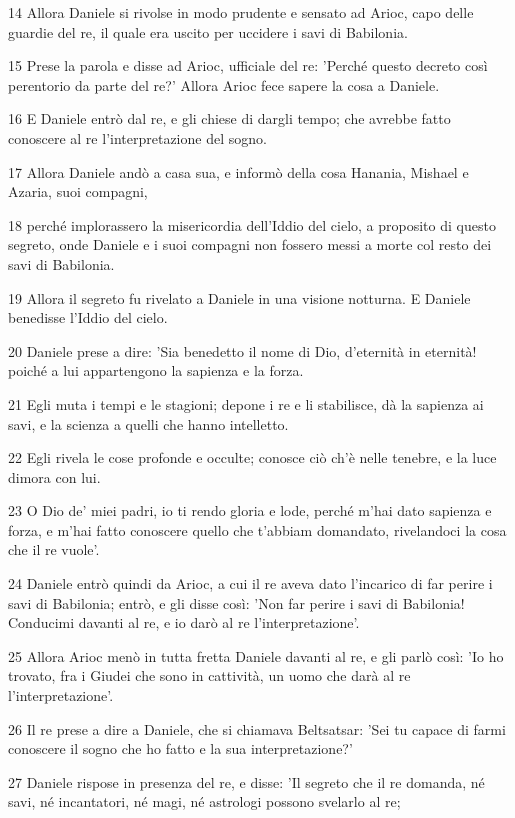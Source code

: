 \par 14 Allora Daniele si rivolse in modo prudente e sensato ad Arioc, capo delle guardie del re, il quale era uscito per uccidere i savi di Babilonia.
\par 15 Prese la parola e disse ad Arioc, ufficiale del re: 'Perché questo decreto così perentorio da parte del re?' Allora Arioc fece sapere la cosa a Daniele.
\par 16 E Daniele entrò dal re, e gli chiese di dargli tempo; che avrebbe fatto conoscere al re l'interpretazione del sogno.
\par 17 Allora Daniele andò a casa sua, e informò della cosa Hanania, Mishael e Azaria, suoi compagni,
\par 18 perché implorassero la misericordia dell'Iddio del cielo, a proposito di questo segreto, onde Daniele e i suoi compagni non fossero messi a morte col resto dei savi di Babilonia.
\par 19 Allora il segreto fu rivelato a Daniele in una visione notturna. E Daniele benedisse l'Iddio del cielo.
\par 20 Daniele prese a dire: 'Sia benedetto il nome di Dio, d'eternità in eternità! poiché a lui appartengono la sapienza e la forza.
\par 21 Egli muta i tempi e le stagioni; depone i re e li stabilisce, dà la sapienza ai savi, e la scienza a quelli che hanno intelletto.
\par 22 Egli rivela le cose profonde e occulte; conosce ciò ch'è nelle tenebre, e la luce dimora con lui.
\par 23 O Dio de' miei padri, io ti rendo gloria e lode, perché m'hai dato sapienza e forza, e m'hai fatto conoscere quello che t'abbiam domandato, rivelandoci la cosa che il re vuole'.
\par 24 Daniele entrò quindi da Arioc, a cui il re aveva dato l'incarico di far perire i savi di Babilonia; entrò, e gli disse così: 'Non far perire i savi di Babilonia! Conducimi davanti al re, e io darò al re l'interpretazione'.
\par 25 Allora Arioc menò in tutta fretta Daniele davanti al re, e gli parlò così: 'Io ho trovato, fra i Giudei che sono in cattività, un uomo che darà al re l'interpretazione'.
\par 26 Il re prese a dire a Daniele, che si chiamava Beltsatsar: 'Sei tu capace di farmi conoscere il sogno che ho fatto e la sua interpretazione?'
\par 27 Daniele rispose in presenza del re, e disse: 'Il segreto che il re domanda, né savi, né incantatori, né magi, né astrologi possono svelarlo al re;
